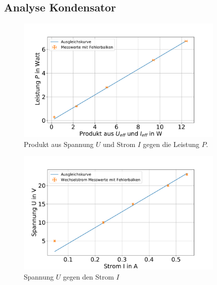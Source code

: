 \subsection{Analyse Kondensator}


\begin{figure}[h]
	\centering
	\includegraphics[width=0.9\textwidth]{res/PgegenUIK.pdf}
	\caption{Produkt aus Spannung $U$ und Strom $I$ gegen die Leistung $P$.}
	\label{fig:PgegenUIK}
\end{figure}


\begin{figure}[h]
	\centering
	\includegraphics[width=0.9\textwidth]{res/UgegenIK.pdf}
	\caption{Spannung $U$ gegen den Strom $I$}
	\label{fig:UgegenIK}
\end{figure}


